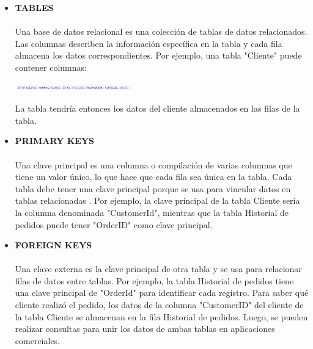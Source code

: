\documentclass[twoside,twocolumn]{article}
\begin{document}
\begin{itemize}
	\item \textbf{TABLES}
	\\
	\\Una base de datos relacional es una colección de tablas de datos relacionados. Las columnas describen la información específica en la tabla y cada fila almacena los datos correspondientes.
    Por ejemplo, una tabla "Cliente" puede contener columnas:
    \\
    \begin{center}
        \includegraphics[width=5cm]{./img/6.png} 
    \end{center}
    
    La tabla tendría entonces los datos del cliente almacenados en las filas de la tabla.
	\\
	\item \textbf{PRIMARY KEYS}
	\\
	\\Una clave principal es una columna o compilación de varias columnas que tiene un valor único, lo que hace que cada fila sea única en la tabla.
    Cada tabla debe tener una clave principal porque se usa para vincular datos en tablas relacionadas . Por ejemplo, la clave principal de la tabla Cliente sería la columna denominada "CustomerId", mientras que la tabla Historial de pedidos puede tener "OrderID" como clave principal.
    \\
	\item \textbf{FOREIGN KEYS}
	\\
	\\Una clave externa es la clave principal de otra tabla y se usa para relacionar filas de datos entre tablas.
    Por ejemplo, la tabla Historial de pedidos tiene una clave principal de "OrderId" para identificar cada registro. Para saber qué cliente realizó el pedido, los datos de la columna "CustomerID" del cliente de la tabla Cliente se almacenan en la fila Historial de pedidos. Luego, se pueden realizar consultas para unir los datos de ambas tablas en aplicaciones comerciales.
    
\end{itemize}
\end{document}
